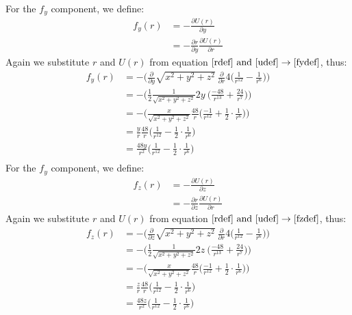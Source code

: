 \documentclass[a4paper,12pt]{article}
\begin{document}
For the $f_y$ component, we define:
\begin{equation}\label{fydef}
\begin{aligned}
f_y(r) &=-\frac{\partial U(r)}{\partial y}\\
&= -\frac{\partial r}{\partial y}\frac{\partial U(r)}{\partial r}
\end{aligned}
\end{equation}
Again we substitute $r$ and $U(r)$ from equation $\eqref{rdef}\ \text{and}\ \eqref{udef} \rightarrow\eqref{fydef}$, thus:
\begin{equation}\label{fycomp}
\begin{aligned}
f_y(r) &= - \bigg( \frac{\partial}{\partial y} \sqrt{x^2+y^2+z^2}\ \frac{\partial}{\partial r} 4 \bigg(\frac{1}{r^{12}}-\frac{1}{r^6}\bigg) \bigg) \\
&= - \bigg( \frac{1}{2} \frac{1}{\sqrt{x^2+y^2+z^2}}2y\ \bigg( \frac{-48}{r^{13}}+\frac{24}{r^7} \bigg) \bigg)\\
&= - \bigg( \frac{x}{\sqrt{x^2+y^2+z^2}} \frac{48}{r} \bigg( \frac{-1}{r^{12}}+\frac{1}{2} \cdot \frac{1}{r^6} \bigg) \bigg)\\
&=  \frac{y}{r} \frac{48}{r} \bigg( \frac{1}{r^{12}}-\frac{1}{2} \cdot \frac{1}{r^6} \bigg)\\
&=  \frac{48y}{r^2} \bigg( \frac{1}{r^{12}}-\frac{1}{2} \cdot \frac{1}{r^6} \bigg)\\
\end{aligned}
\end{equation}
For the $f_y$ component, we define:
\begin{equation}\label{fzdef}
\begin{aligned}
f_z(r) &=-\frac{\partial U(r)}{\partial z}\\
&= -\frac{\partial r}{\partial z}\frac{\partial U(r)}{\partial r}
\end{aligned}
\end{equation}
Again we substitute $r$ and $U(r)$ from equation $\eqref{rdef}\ \text{and}\ \eqref{udef} \rightarrow\eqref{fzdef}$, thus:
\begin{equation}\label{fzcomp}
\begin{aligned}
f_z(r) &= - \bigg( \frac{\partial}{\partial z} \sqrt{x^2+y^2+z^2}\ \frac{\partial}{\partial r} 4 \bigg(\frac{1}{r^{12}}-\frac{1}{r^6}\bigg) \bigg) \\
&= - \bigg( \frac{1}{2} \frac{1}{\sqrt{x^2+y^2+z^2}}2z\ \bigg( \frac{-48}{r^{13}}+\frac{24}{r^7} \bigg) \bigg)\\
&= - \bigg( \frac{x}{\sqrt{x^2+y^2+z^2}} \frac{48}{r} \bigg( \frac{-1}{r^{12}}+\frac{1}{2} \cdot \frac{1}{r^6} \bigg) \bigg)\\
&=  \frac{z}{r} \frac{48}{r} \bigg( \frac{1}{r^{12}}-\frac{1}{2} \cdot \frac{1}{r^6} \bigg)\\
&=  \frac{48z}{r^2} \bigg( \frac{1}{r^{12}}-\frac{1}{2} \cdot \frac{1}{r^6} \bigg)\\
\end{aligned}
\end{equation}
\end{document}
